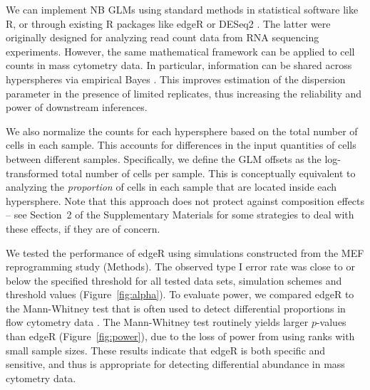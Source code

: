 \documentclass{article}
\newcommand{\suppcomponorm}{2}
\begin{document}
We can implement NB GLMs using standard methods in statistical software like R, or through existing R packages like edgeR \cite{robinson2010edgeR} or DESeq2 \cite{love2014moderated}.
The latter were originally designed for analyzing read count data from RNA sequencing experiments.
However, the same mathematical framework can be applied to cell counts in mass cytometry data.
In particular, information can be shared across hyperspheres via empirical Bayes \cite{mccarthy2012differential, lund2012detecting}.
This improves estimation of the dispersion parameter in the presence of limited replicates, thus increasing the reliability and power of downstream inferences.

We also normalize the counts for each hypersphere based on the total number of cells in each sample.
This accounts for differences in the input quantities of cells between different samples.
Specifically, we define the GLM offsets as the log-transformed total number of cells per sample.
This is conceptually equivalent to analyzing the \textit{proportion} of cells in each sample that are located inside each hypersphere.
Note that this approach does not protect against composition effects -- see Section~\suppcomponorm{} of the Supplementary Materials for some strategies to deal with these effects, if they are of concern.

We tested the performance of edgeR using simulations constructed from the MEF reprogramming study (Methods).
The observed type I error rate was close to or below the specified threshold for all tested data sets, simulation schemes and threshold values (Figure~\ref{fig:alpha}).
To evaluate power, we compared edgeR to the Mann-Whitney test that is often used to detect differential proportions in flow cytometry data \cite{watson1992significance}.
The Mann-Whitney test routinely yields larger $p$-values than edgeR (Figure~\ref{fig:power}), due to the loss of power from using ranks with small sample sizes.
These results indicate that edgeR is both specific and sensitive, and thus is appropriate for detecting differential abundance in mass cytometry data.
\end{document}

